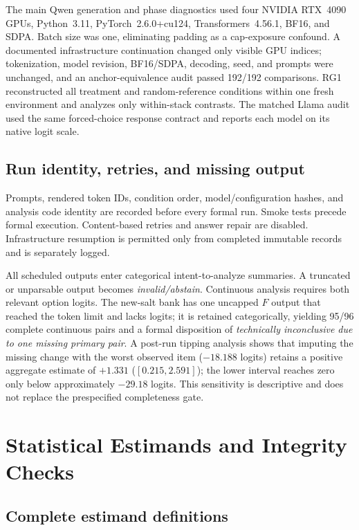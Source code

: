 \documentclass[letterpaper]{article}
\begin{document}
The main Qwen generation and phase diagnostics used four NVIDIA RTX~4090 GPUs, Python~3.11, PyTorch~2.6.0+cu124, Transformers~4.56.1, BF16, and SDPA.  Batch size was one, eliminating padding as a cap-exposure confound.  A documented infrastructure continuation changed only visible GPU indices; tokenization, model revision, BF16/SDPA, decoding, seed, and prompts were unchanged, and an anchor-equivalence audit passed 192/192 comparisons.  RG1 reconstructed all treatment and random-reference conditions within one fresh environment and analyzes only within-stack contrasts.  The matched Llama audit used the same forced-choice response contract and reports each model on its native logit scale.

\subsection{Run identity, retries, and missing output}

Prompts, rendered token IDs, condition order, model/configuration hashes, and analysis code identity are recorded before every formal run.  Smoke tests precede formal execution.  Content-based retries and answer repair are disabled.  Infrastructure resumption is permitted only from completed immutable records and is separately logged.

All scheduled outputs enter categorical intent-to-analyze summaries.  A truncated or unparsable output becomes \emph{invalid/abstain}.  Continuous analysis requires both relevant option logits.  The new-salt bank has one uncapped $F$ output that reached the token limit and lacks logits; it is retained categorically, yielding 95/96 complete continuous pairs and a formal disposition of \emph{technically inconclusive due to one missing primary pair}.  A post-run tipping analysis shows that imputing the missing change with the worst observed item ($-18.188$ logits) retains a positive aggregate estimate of $+1.331$ ($[0.215,2.591]$); the lower interval reaches zero only below approximately $-29.18$ logits.  This sensitivity is descriptive and does not replace the prespecified completeness gate.

\section{Statistical Estimands and Integrity Checks}
\label{supp:inference}

\subsection{Complete estimand definitions}
\end{document}
